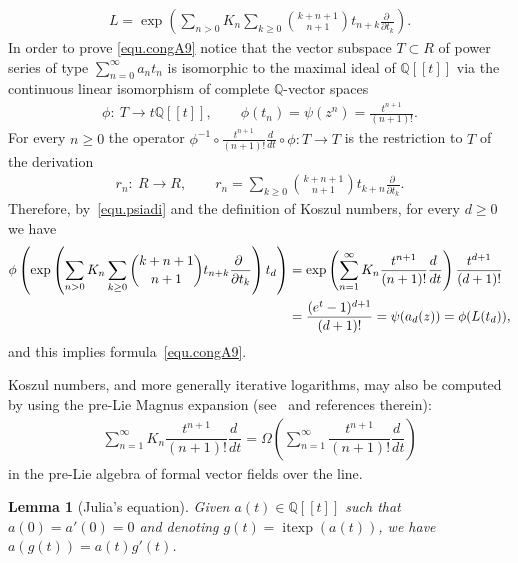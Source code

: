 \documentclass[pdftex]{sigma}
\newcommand{\Q}{\mathbb{Q}}
\numberwithin{equation}{section}
\newtheorem{Lemma}[Theorem]{Lemma}
 { \theoremstyle{definition}
\newtheorem{Definition}[Theorem]{Definition}
\newtheorem{Example}[Theorem]{Example}
\newtheorem{Remark}[Theorem]{Remark} }
\begin{document}
\begin{Remark}
\begin{gather}
L=\exp\left(\sum_{n>0}K_n\sum_{k\ge 0}\binom{k+n+1}{n+1}t_{n+k}\frac{\partial~}{\partial t_k}\right) .\end{gather}
In order to prove \eqref{equ.congA9} notice that the vector subspace $T\subset R$ of power series of type $\sum\limits_{n=0}^{\infty} a_nt_n$ is isomorphic to the maximal ideal of $\Q[[t]]$ via the continuous linear isomorphism of complete $\Q$-vector spaces
\begin{gather*} \phi\colon \ T\to t\Q[[t]],\qquad \phi(t_n)=\psi(z^n)=\frac{t^{n+1}}{(n+1)!} .\end{gather*}
For every $n\ge 0$ the operator $\phi^{-1}\circ \frac{t^{n+1}}{(n+1)!}\frac{d~}{dt}\circ \phi\colon T\to T$
is the restriction to $T$ of the derivation
\begin{gather*} r_n\colon \ R\to R,\qquad r_n=\sum_{k\ge 0} \binom{k+n+1}{n+1}t_{k+n}\frac{\partial~}{\partial t_k} .\end{gather*}
Therefore, by~\eqref{equ.psiadi} and the def\/inition of Koszul numbers, for every $d\ge 0$ we have
\begin{gather*}
\begin{split}
&\phi\left(\exp\left(\sum_{n>0}K_n\sum_{k\ge 0}\binom{k+n+1}{n+1}t_{n+k}
\frac{\partial~}{\partial t_k}\right)t_d\right) =
\exp\left(\sum_{n=1}^{\infty}K_n\dfrac{t^{n+1}}{ (n+1)! }\dfrac{d~}{ dt }\right)\frac{t^{d+1}}{(d+1)!}\\
& \hphantom{\phi\left(\exp\left(\sum_{n>0}K_n\sum_{k\ge 0}\binom{k+n+1}{n+1}t_{n+k}
\frac{\partial~}{\partial t_k}\right)t_d\right)}{}
 =\frac{(e^t-1)^{d+1}}{(d+1)!}=
\psi(a_d(z))=\phi(L(t_d)),
\end{split}
\end{gather*}
and this implies formula~\eqref{equ.congA9}.
\end{Remark}

\begin{Remark}\label{rem.magnus} Koszul numbers, and more generally iterative logarithms, may also be computed by using the pre-Lie Magnus expansion (see~\cite{pLDF} and references therein):
\begin{gather*} \sum_{n=1}^{\infty}K_n\dfrac{t^{n+1}}{ (n+1)! }\dfrac{d~}{ dt }=
\Omega\left(\sum_{n=1}^{\infty}\dfrac{t^{n+1}}{ (n+1)! }\dfrac{d~}{ dt }\right)\end{gather*}
in the pre-Lie algebra of formal vector f\/ields over the line.
\end{Remark}

\begin{Lemma}[Julia's equation]\label{lem.lemmachiave}
Given $a(t)\in \Q[[t]]$ such that $a(0)=a'(0)=0$ and denoting $g(t)=\operatorname{itexp}(a(t))$, we have $a(g(t))=a(t)g'(t)$.
\end{Lemma}
\end{document}
